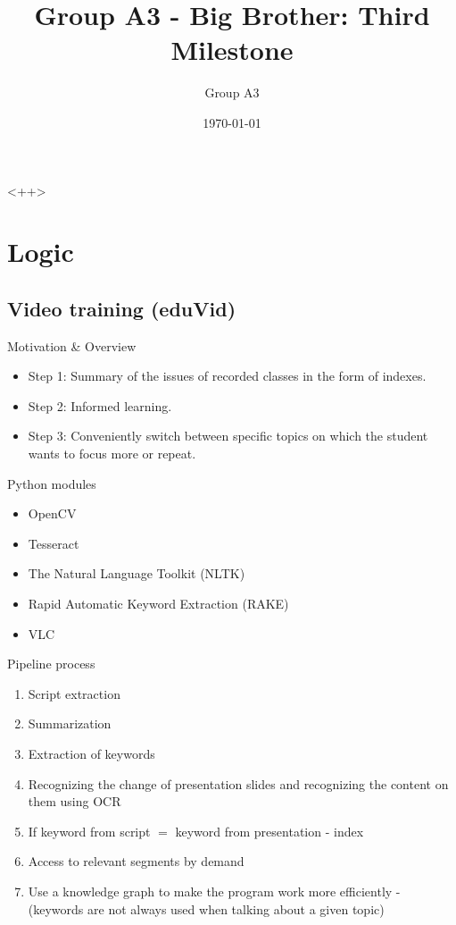 \documentclass[xcolor=x11names,table]{beamer}
\title[\textcolor{white}{Third Milestone}]
{Group A3 - Big Brother: Third Milestone}
\author{Group A3}
\institute[TU Berlin]{TU Berlin}
\date{\today}
\begin{document}
\begin{frame}
\titlepage
\end{frame}

\begin{frame}{<++>}
\tableofcontents
\end{frame}



\section{Logic}

\title[\textcolor{white}{Milosz}]{}
\subsection{Video training (eduVid)}
\begin{frame}{Motivation \& Overview}
\begin{itemize}
    \item Step 1: Summary of the issues of recorded classes in the form of
    indexes.
    \item Step 2: Informed learning.
    \item Step 3: Conveniently switch between specific topics on 
    which the student wants to focus more or repeat.
\end{itemize}
\end{frame}

\begin{frame}{Python modules}
\begin{itemize}
    \item OpenCV
    \item Tesseract
    \item The Natural Language Toolkit (NLTK)
    \item Rapid Automatic Keyword Extraction (RAKE)
    \item VLC
\end{itemize}
\end{frame}

\begin{frame}{Pipeline process}
\begin{enumerate}
    \item Script extraction
    \item Summarization
    \item Extraction of keywords
    \item Recognizing the change of presentation slides and recognizing
    the content on them using OCR
    \item If keyword from script $=$ keyword from presentation -
    index
    \item Access to relevant segments by demand
    \item Use a knowledge graph to make the program work more efficiently
    - (keywords are not always used when talking about a given topic)
\end{enumerate}
\end{frame}
\end{document}
